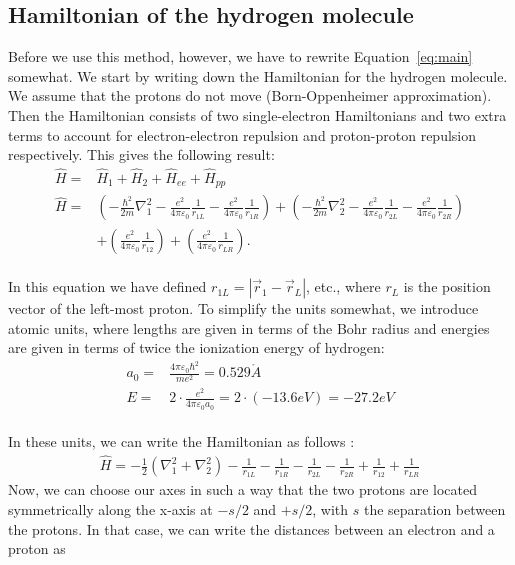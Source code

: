 \subsection{Hamiltonian of the hydrogen molecule}
Before we use this method, however, we have to rewrite Equation~\ref{eq:main} somewhat. We start by writing down the Hamiltonian for the hydrogen molecule. We assume that the protons do not move (Born-Oppenheimer approximation). Then the Hamiltonian consists of two single-electron Hamiltonians and two extra terms to account for electron-electron repulsion and proton-proton repulsion respectively. This gives the following result:
\begin{align}	   
\hat H =& {\hat H_1} + {\hat H_2} + {\hat H_{ee}} + {\hat H_{pp}}\\
\hat H =& \left( { - \frac{{{\hbar ^2}}}{{2m}}\nabla _1^2 - \frac{{{e^2}}}{{4\pi {\varepsilon _0}}}\frac{1}{{{r_{1L}}}} - \frac{{{e^2}}}{{4\pi {\varepsilon _0}}}\frac{1}{{{r_{1R}}}}} \right) + \left( { - \frac{{{\hbar ^2}}}{{2m}}\nabla _2^2 - \frac{{{e^2}}}{{4\pi {\varepsilon _0}}}\frac{1}{{{r_{2L}}}} - \frac{{{e^2}}}{{4\pi {\varepsilon _0}}}\frac{1}{{{r_{2R}}}}} \right)\nonumber\\
& + \left( {\frac{{{e^2}}}{{4\pi {\varepsilon _0}}}\frac{1}{{{r_{12}}}}} \right) + \left( {\frac{{{e^2}}}{{4\pi {\varepsilon _0}}}\frac{1}{{{r_{LR}}}}} \right).
\end{align}\\
In this equation we have defined ${r_{1L}} = \left| {{{\vec r}_1} - {{\vec r}_L}} \right|$, etc., where $r_L$ is the position vector of the left-most proton. To simplify the units somewhat, we introduce atomic units, where lengths are given in terms of the Bohr radius and energies are given in terms of twice the ionization energy of hydrogen:
\begin{align}
{a_0} =& \frac{{4\pi {\varepsilon _0}{\hbar ^2}}}{{m{e^2}}} = 0.529\mathring{A}\\
E =& 2 \cdot \frac{{{e^2}}}{{4\pi {\varepsilon _0}{a_0}}} = 2 \cdot \left( { - 13.6eV} \right) =  - 27.2eV
\end{align}\\
In these units, we can write the Hamiltonian as follows \cite{MSU_paper}:
\begin{align}
\hat H =  - \frac{1}{2}\left( {\nabla _1^2 + \nabla _2^2} \right) - \frac{1}{{{r_{1L}}}} - \frac{1}{{{r_{1R}}}} - \frac{1}{{{r_{2L}}}} - \frac{1}{{{r_{2R}}}} + \frac{1}{{{r_{12}}}} + \frac{1}{{{r_{LR}}}}
\end{align}
Now, we can choose our axes in such a way that the two protons are located symmetrically along the x-axis at $-s/2$ and $+s/2$, with $s$ the separation between the protons. In that case, we can write the distances between an electron and a proton as
